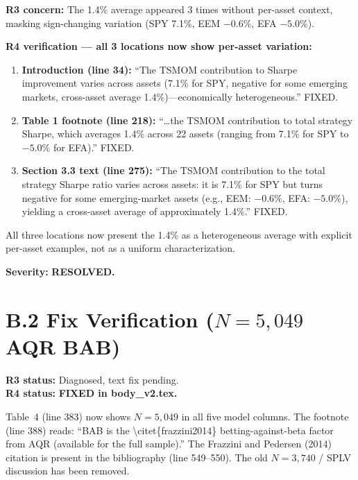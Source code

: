 \documentclass[12pt,a4paper]{article}
\begin{document}
\textbf{R3 concern:} The 1.4\% average appeared 3 times without per-asset context, masking sign-changing variation (SPY 7.1\%, EEM $-0.6\%$, EFA $-5.0\%$).

\medskip
\noindent\textbf{R4 verification --- all 3 locations now show per-asset variation:}

\begin{enumerate}[nosep]

\item \textbf{Introduction (line 34):} ``The TSMOM contribution to Sharpe improvement varies across assets (7.1\% for SPY, negative for some emerging markets, cross-asset average 1.4\%)---economically heterogeneous.'' \textcolor{okgreen}{FIXED.}

\item \textbf{Table 1 footnote (line 218):} ``\ldots the TSMOM contribution to total strategy Sharpe, which averages 1.4\% across 22 assets (ranging from 7.1\% for SPY to $-5.0\%$ for EFA).'' \textcolor{okgreen}{FIXED.}

\item \textbf{Section 3.3 text (line 275):} ``The TSMOM contribution to the total strategy Sharpe ratio varies across assets: it is 7.1\% for SPY but turns negative for some emerging-market assets (e.g., EEM: $-0.6\%$, EFA: $-5.0\%$), yielding a cross-asset average of approximately 1.4\%.'' \textcolor{okgreen}{FIXED.}

\end{enumerate}

\noindent All three locations now present the 1.4\% as a heterogeneous average with explicit per-asset examples, not as a uniform characterization.

\textbf{Severity:} \textcolor{okgreen}{\textbf{RESOLVED.}}


\section{B.2 Fix Verification ($N = 5{,}049$ AQR BAB)}

\textbf{R3 status:} Diagnosed, text fix pending.\\
\textbf{R4 status:} \textcolor{okgreen}{\textbf{FIXED in body\_v2.tex.}}

Table~4 (line 383) now shows $N = 5{,}049$ in all five model columns. The footnote (line 388) reads: ``BAB is the \textbackslash citet\{frazzini2014\} betting-against-beta factor from AQR (available for the full sample).'' The Frazzini and Pedersen (2014) citation is present in the bibliography (line 549--550). The old $N = 3{,}740$ / SPLV discussion has been removed.
\end{document}
